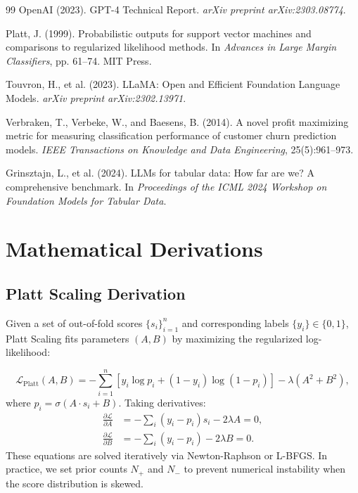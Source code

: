 \documentclass[12pt, a4paper]{article}
\begin{document}
\begin{thebibliography}{99}
OpenAI (2023).
\newblock GPT-4 Technical Report.
\newblock \emph{arXiv preprint arXiv:2303.08774}.

Platt, J. (1999).
\newblock Probabilistic outputs for support vector machines and comparisons to regularized likelihood methods.
\newblock In \emph{Advances in Large Margin Classifiers}, pp. 61--74. MIT Press.

Touvron, H., et al. (2023).
\newblock LLaMA: Open and Efficient Foundation Language Models.
\newblock \emph{arXiv preprint arXiv:2302.13971}.

Verbraken, T., Verbeke, W., and Baesens, B. (2014).
\newblock A novel profit maximizing metric for measuring classification performance of customer churn prediction models.
\newblock \emph{IEEE Transactions on Knowledge and Data Engineering}, 25(5):961--973.

Grinsztajn, L., et al. (2024).
\newblock LLMs for tabular data: How far are we? A comprehensive benchmark.
\newblock In \emph{Proceedings of the ICML 2024 Workshop on Foundation Models for Tabular Data}.

\end{thebibliography}


\appendix
\renewcommand{\thetable}{A\arabic{table}}
\renewcommand{\thefigure}{A\arabic{figure}}

\section{Mathematical Derivations}\label{app:mlp_deriv}

\subsection{Platt Scaling Derivation}

Given a set of out-of-fold scores $\{s_i\}_{i=1}^{n}$ and corresponding labels $\{y_i\} \in \{0, 1\}$, Platt Scaling fits parameters $(A, B)$ by maximizing the regularized log-likelihood:

\begin{equation}
\mathcal{L}_{\text{Platt}}(A, B) = -\sum_{i=1}^{n} \left[ y_i \log p_i + (1-y_i)\log(1-p_i) \right] - \lambda(A^2 + B^2),
\end{equation}
where $p_i = \sigma(A \cdot s_i + B)$. Taking derivatives:
\begin{align}
\frac{\partial \mathcal{L}}{\partial A} &= -\sum_i (y_i - p_i) s_i - 2\lambda A = 0, \\
\frac{\partial \mathcal{L}}{\partial B} &= -\sum_i (y_i - p_i) - 2\lambda B = 0.
\end{align}
These equations are solved iteratively via Newton-Raphson or L-BFGS. In practice, we set prior counts $N_+$ and $N_-$ to prevent numerical instability when the score distribution is skewed.
\end{document}

